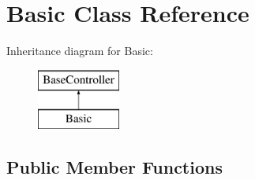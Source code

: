 \hypertarget{class_basic}{}\section{Basic Class Reference}
\label{class_basic}
Inheritance diagram for Basic\+:\begin{figure}[H]
\begin{center}
\leavevmode
\includegraphics[height=2.000000cm]{class_basic}
\end{center}
\end{figure}
\subsection*{Public Member Functions}
